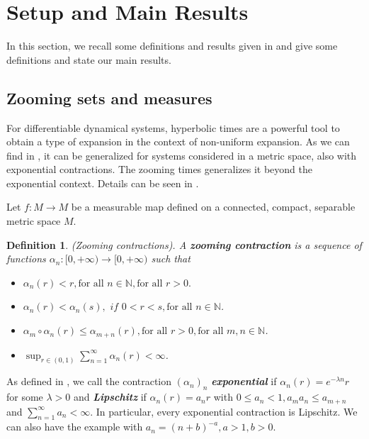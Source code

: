 \documentclass[12pt,a4paper]{amsart}
\theoremstyle{plain}
\newtheorem{definition}{Definition}[subsection]
\begin{document}
\section{Setup and Main Results}\label{Setup}

In this section, we recall some definitions and results given in \cite{S} and give some definitions and state our main results. 

\subsection{Zooming sets and measures}

For differentiable dynamical systems, hyperbolic times are a powerful tool to obtain a type of expansion in the context of non-uniform expansion. As we can find in \cite{AOS}, it can be generalized for systems considered in a metric space, also with exponential contractions. The zooming times generalizes it beyond the exponential
context. Details can be seen in \cite{Pi1}.

Let $f : M \to M$ be a measurable map defined on a connected, compact, separable metric space $M$.

\begin{definition}
	(Zooming contractions). A \textbf{\textit{zooming contraction}} is a sequence of functions $\alpha_{n}: [0,+\infty) \to [0,+\infty)$ such that
	
	\begin{itemize}
		\item $\alpha_{n}(r) < r, \text{for all} \, \, n \in \mathbb{N}, \text{for all} \, \, r>0.$
		
		\item $\alpha_{n}(r)<\alpha_{n}(s), \,\, if \,\, 0<r<s, \text{for all} \, \, n \in \mathbb{N}$.
		
		\item $\alpha_{m} \circ \alpha_{n}(r) \leq \alpha_{m+n}(r), \text{for all} \, \, r>0, \text{for all} \, \, m,n \in \mathbb{N}$.
		
		\item $\displaystyle \sup_{r \in (0,1)} \sum_{n=1}^{\infty}\alpha_{n}(r) < \infty$.
	\end{itemize}
	
\end{definition}

As defined in \cite{PV}, we call the contraction $(\alpha_{n})_{n}$ \textbf{\textit{exponential}} if $\alpha_{n}(r) = e^{-\lambda n} r$ for some $\lambda > 0$ and \textbf{\textit{Lipschitz}} if $\alpha_{n}(r) = a_{n} r$ with $0 \leq a_{n} < 1, a_{m}a_{n} \leq a_{m+n}$ and $\sum_{n=1}^{\infty} a_{n} < \infty$. In particular, every exponential contraction is Lipschitz. We can also have the example with $a_{n} = (n+b)^{-a}, a > 1, b>0$.
\end{document}
